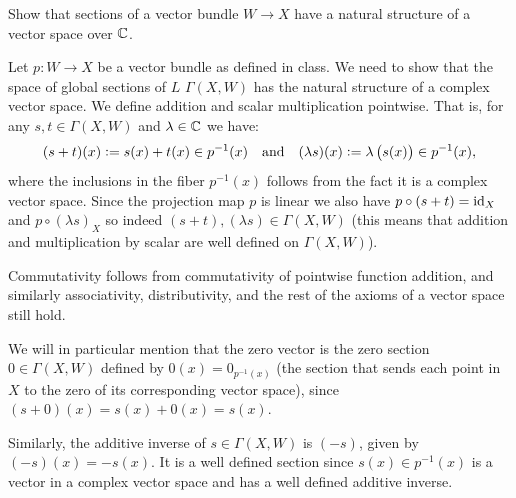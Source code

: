 \documentclass[11pt, a4paper]{article}
\begin{document}
\begin{exercise}
  Show that sections of a vector bundle $W \to X$ have a
  natural structure of a vector space over $\mathbb{C}$.
\end{exercise}
\begin{solution}
  Let $p \colon W \to X$ be a vector bundle as defined in class.
  We need to show that the space of global sections of $L$ $\Gamma(X,W)$
  has the natural structure of a complex vector space.
  We define addition and scalar multiplication pointwise.
  That is, for any $s,t \in \Gamma(X,W)$ and $\lambda \in \mathbb{C}$ we have:
  \[
    (s + t)(x) := s(x) + t(x) \in p^{-1}(x) \tand
    (\lambda s)(x) := \lambda\del{s(x)} \in p^{-1}(x),
  \]
  where the inclusions in the fiber $p^{-1}(x)$ follows from the fact
  it is a complex vector space.
  Since the projection map $p$ is linear we also have
  $p \circ (s + t) = \operatorname{id}_X$ and $p \circ (\lambda s)_X$
  so indeed $(s+t),(\lambda s) \in \Gamma(X,W)$
  (this means that addition and multiplication
  by scalar are well defined on $\Gamma(X,W)$).

  Commutativity follows from commutativity of pointwise function addition,
  and similarly associativity, distributivity, and the rest of the axioms
  of a vector space still hold.

  We will in particular mention that the zero vector
  is the zero section $0 \in \Gamma(X,W)$
  defined by $0(x) = 0_{p^{-1}(x)}$ (the section that sends each point
  in $X$ to the zero of its corresponding vector space),
  since $(s + 0)(x) = s(x) + 0(x) = s(x)$.

  Similarly, the additive inverse of $s \in \Gamma(X,W)$ is $(-s)$,
  given by $(-s)(x) = -s(x)$.
  It is a well defined section since $s(x) \in p^{-1}(x)$ is a vector in a
  complex vector space and has a well defined additive inverse.
\end{solution}
\end{document}
